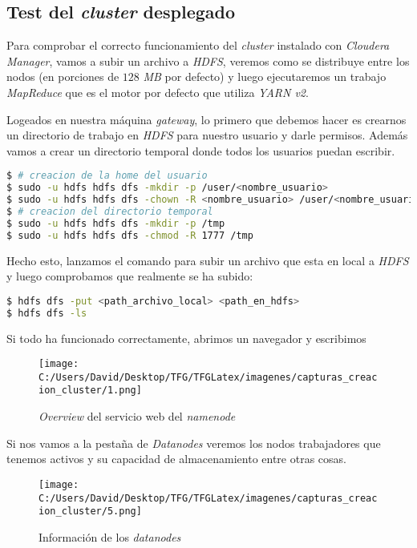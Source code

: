 \subsection{Test del \textit{cluster} desplegado}\label{test_cluster_desplegado}
Para comprobar el correcto funcionamiento del \textit{cluster} instalado con \textit{Cloudera Manager}, vamos a subir
un archivo a \textit{HDFS}, veremos como se distribuye entre los nodos (en porciones de $128$ \textit{MB} por defecto) 
y luego ejecutaremos un trabajo \textit{MapReduce} que es el motor por defecto que utiliza \textit{YARN v2}.

\clearpage

Logeados en nuestra máquina \textit{gateway}, lo primero que debemos hacer es crearnos un directorio de trabajo
en \textit{HDFS} para nuestro usuario y darle permisos. Además vamos a crear un directorio temporal donde
todos los usuarios puedan escribir.

\begin{lstlisting}[language=bash, numbers=none]
$ # creacion de la home del usuario
$ sudo -u hdfs hdfs dfs -mkdir -p /user/<nombre_usuario>
$ sudo -u hdfs hdfs dfs -chown -R <nombre_usuario> /user/<nombre_usuario>
$ # creacion del directorio temporal
$ sudo -u hdfs hdfs dfs -mkdir -p /tmp
$ sudo -u hdfs hdfs dfs -chmod -R 1777 /tmp
\end{lstlisting}

Hecho esto, lanzamos el comando para subir un archivo que esta en local a \textit{HDFS} y luego comprobamos
que realmente se ha subido:

\begin{lstlisting}[language=bash, numbers=none]
$ hdfs dfs -put <path_archivo_local> <path_en_hdfs>
$ hdfs dfs -ls
\end{lstlisting}

Si todo ha funcionado correctamente, abrimos un navegador y escribimos 

\begin{figure}[!htpb]
  \centering
  \texttt{[image: C:/Users/David/Desktop/TFG/TFGLatex/imagenes/capturas\_creacion\_cluster/1.png]}
  \caption[\textit{Overview web namenode}]{\textit{Overview} del servicio web del \textit{namenode}}
\end{figure}

Si nos vamos a la pestaña de \textit{Datanodes} veremos los nodos trabajadores que tenemos activos y su 
capacidad de almacenamiento entre otras cosas.

\begin{figure}[!htpb]
  \centering
  \texttt{[image: C:/Users/David/Desktop/TFG/TFGLatex/imagenes/capturas\_creacion\_cluster/5.png]}
  \caption[Información web \textit{Datanode}]{Información de los \textit{datanodes}}
\end{figure}

